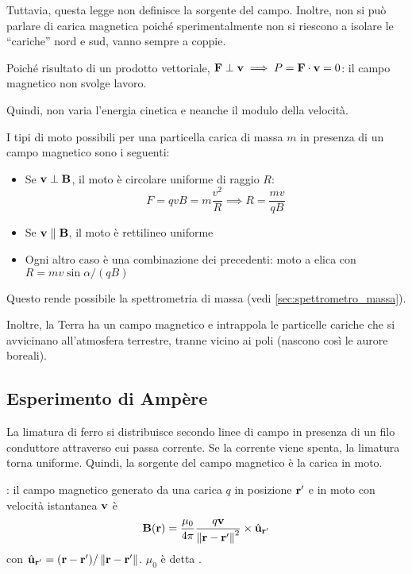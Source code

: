 Tuttavia, questa legge non definisce la sorgente del campo.
Inoltre, non si può parlare di carica magnetica poiché sperimentalmente non si riescono a isolare le ``cariche'' nord e sud, vanno sempre a coppie.

Poiché risultato di un prodotto vettoriale, $\mathbf{F} \perp \mathbf{v} \implies P = \mathbf{F} \cdot \mathbf{v} = 0$: il campo magnetico non svolge lavoro.

Quindi, non varia l'energia cinetica e neanche il modulo della velocità.

I tipi di moto possibili per una particella carica di massa $m$ in presenza di un campo magnetico sono i seguenti:
\begin{itemize}
    \item Se $\mathbf{v} \perp \mathbf{B}$, il moto è circolare uniforme di raggio $R$:
        \begin{equation}
            F = qvB = m \frac{v^2}{R} \implies R = \frac{mv}{qB}
        \end{equation}
    \item Se $\mathbf{v} \parallel \mathbf{B}$, il moto è rettilineo uniforme
    \item Ogni altro caso è una combinazione dei precedenti: moto a elica con $R = mv\sin{\alpha}/(qB)$
\end{itemize}

Questo rende possibile la spettrometria di massa (vedi \autoref{sec:spettrometro_massa}).

Inoltre, la Terra ha un campo magnetico e intrappola le particelle cariche che si avvicinano all'atmosfera terrestre, tranne vicino ai poli (nascono così le aurore boreali).

\subsection{Esperimento di Ampère}

La limatura di ferro si distribuisce secondo linee di campo in presenza di un filo conduttore attraverso cui passa corrente.
Se la corrente viene spenta, la limatura torna uniforme.
Quindi, la sorgente del campo magnetico è la carica in moto.

: il campo magnetico generato da una carica $q$ in posizione $\mathbf{r}'$ e in moto con velocità istantanea $\mathbf{v}$ è
\begin{equation}
    \mathbf{B}(\mathbf{r}) = \frac{\mu_0}{4\pi} \frac{q \mathbf{v}}{\left\lVert \mathbf{r} - \mathbf{r}' \right\rVert^2} \times \hat{\mathbf{u}}_{\mathbf{r}'}
\end{equation}
con $\hat{\mathbf{u}}_{\mathbf{r}'} = (\mathbf{r} - \mathbf{r}')/\left\lVert \mathbf{r} - \mathbf{r}' \right\rVert$.
$\mu_0$ è detta .

